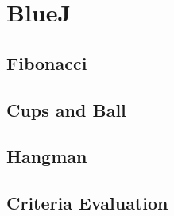 \section{BlueJ}
\label{sec:bluej}


\subsection{Fibonacci}

\subsection{Cups and Ball}

\subsection{Hangman}


\subsection{Criteria Evaluation}

